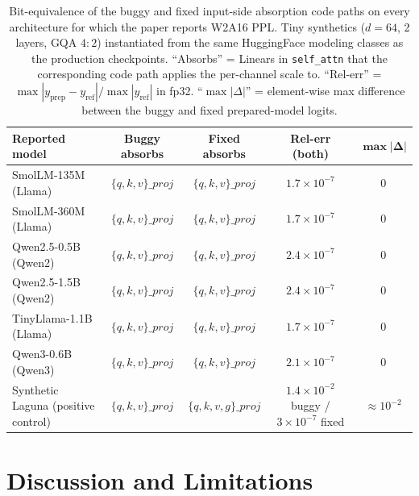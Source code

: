 \documentclass[11pt]{article}
\begin{document}
\begin{table}[t]
\centering
\small
\caption{Bit-equivalence of the buggy and fixed input-side absorption code paths on every architecture for which the paper reports W2A16 PPL. Tiny synthetics ($d=64$, 2 layers, GQA $4{:}2$) instantiated from the same HuggingFace modeling classes as the production checkpoints. ``Absorbs'' = Linears in \texttt{self\_attn} that the corresponding code path applies the per-channel scale to. ``Rel-err'' = $\max|y_{\text{prep}} - y_{\text{ref}}| / \max|y_{\text{ref}}|$ in fp32. ``$\max|\Delta|$'' = element-wise max difference between the buggy and fixed prepared-model logits.}
\label{tab:gproj_inactive}
\begin{tabular}{lcccc}
\toprule
\textbf{Reported model} & \textbf{Buggy absorbs} & \textbf{Fixed absorbs} & \textbf{Rel-err (both)} & $\boldsymbol{\max|\Delta|}$ \\
\midrule
SmolLM-135M (Llama)     & $\{q,k,v\}\_proj$ & $\{q,k,v\}\_proj$ & $1.7 \times 10^{-7}$ & $0$ \\
SmolLM-360M (Llama)     & $\{q,k,v\}\_proj$ & $\{q,k,v\}\_proj$ & $1.7 \times 10^{-7}$ & $0$ \\
Qwen2.5-0.5B (Qwen2)    & $\{q,k,v\}\_proj$ & $\{q,k,v\}\_proj$ & $2.4 \times 10^{-7}$ & $0$ \\
Qwen2.5-1.5B (Qwen2)    & $\{q,k,v\}\_proj$ & $\{q,k,v\}\_proj$ & $2.4 \times 10^{-7}$ & $0$ \\
TinyLlama-1.1B (Llama)  & $\{q,k,v\}\_proj$ & $\{q,k,v\}\_proj$ & $1.7 \times 10^{-7}$ & $0$ \\
Qwen3-0.6B (Qwen3)      & $\{q,k,v\}\_proj$ & $\{q,k,v\}\_proj$ & $2.1 \times 10^{-7}$ & $0$ \\
\midrule
Synthetic Laguna (positive control) & $\{q,k,v\}\_proj$ & $\{q,k,v,g\}\_proj$ & $1.4 \times 10^{-2}$ buggy / $3 \times 10^{-7}$ fixed & $\approx 10^{-2}$ \\
\bottomrule
\end{tabular}
\end{table}

\section{Discussion and Limitations}
\end{document}
